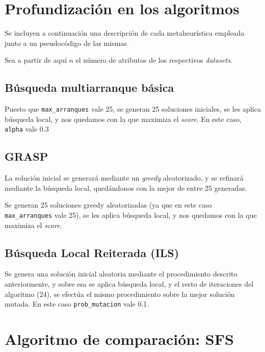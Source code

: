 \documentclass[a4paper,11pt]{article}
\begin{document}
\section{Profundización en los algoritmos}
Se incluyen a continuación una descripción de cada metaheurística empleada junto a un pseudocódigo de las mismas.

Sea a partir de aquí $n$ el número de atributos de los respectivos \textit{datasets}.
\subsection{Búsqueda multiarranque básica}
Puesto que \texttt{max\_arranques} vale 25, se generan 25 soluciones iniciales, se les aplica búsqueda local, y nos quedamos
con la que maximiza el \textit{score}. En este caso, \texttt{alpha} vale 0.3\\

\small{\texttt{}}
\normalsize

\subsection{GRASP}
La solución inicial se generará mediante un \textit{greedy} aleatorizado, y se refinará mediante
la búsqueda local, quedándonos con la mejor de entre 25 generadas.\\
   
\small\texttt{}
\normalsize

Se generan 25 soluciones greedy aleatorizadas (ya que en este caso \texttt{max\_arranques} vale 25), se les aplica búsqueda
local, y nos quedamos con la que maximiza el \textit{score}.\\

\small{\texttt{}}
\normalsize

\subsection{Búsqueda Local Reiterada (ILS)}
Se genera una solución inicial aleatoria mediante el procedimiento descrito anteriormente, y sobre esa se
aplica búsqueda local, y el resto de iteraciones del algoritmo (24), se efectúa el mismo procedimiento sobre la mejor solución
mutada. En este caso \texttt{prob\_mutacion} vale 0.1.\\

\small{\texttt{}}
\normalsize

\section{Algoritmo de comparación: SFS}
\small{\texttt{}}
\end{document}
